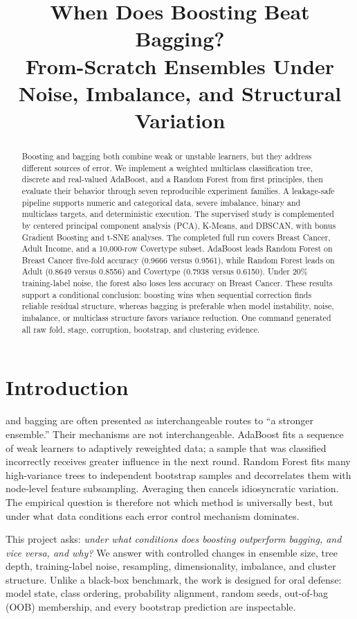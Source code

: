 \documentclass[conference]{IEEEtran}
\title{When Does Boosting Beat Bagging?\\
\large From-Scratch Ensembles Under Noise, Imbalance, and Structural Variation}
\author{
\IEEEauthorblockN{Member A, Member B, Member C, Member D}
\IEEEauthorblockA{AI Academy, National AI Center\\Spring 2026}
}
\begin{document}
\maketitle

\begin{abstract}
Boosting and bagging both combine weak or unstable learners, but they address
different sources of error. We implement a weighted multiclass classification
tree, discrete and real-valued AdaBoost, and a Random Forest from first
principles, then evaluate their behavior through seven reproducible experiment
families. A leakage-safe pipeline supports numeric and categorical data,
severe imbalance, binary and multiclass targets, and deterministic execution.
The supervised study is complemented by centered principal component analysis
(PCA), K-Means, and DBSCAN, with bonus Gradient Boosting and t-SNE analyses.
The completed full run covers Breast Cancer, Adult Income, and a 10,000-row
Covertype subset. AdaBoost leads Random Forest on Breast Cancer five-fold
accuracy (0.9666 versus 0.9561), while Random Forest leads on Adult (0.8649
versus 0.8556) and Covertype (0.7938 versus 0.6150). Under 20\% training-label
noise, the forest also loses less accuracy on Breast Cancer. These results
support a conditional conclusion: boosting wins when sequential correction
finds reliable residual structure, whereas bagging is preferable when model
instability, noise, imbalance, or multiclass structure favors variance
reduction. One command generated all raw fold, stage, corruption, bootstrap,
and clustering evidence.
\end{abstract}

\section{Introduction}
 and bagging are often presented as interchangeable
routes to ``a stronger ensemble.'' Their mechanisms are not interchangeable.
AdaBoost fits a sequence of weak learners to adaptively reweighted data; a
sample that was classified incorrectly receives greater influence in the next
round. Random Forest fits many high-variance trees to independent bootstrap
samples and decorrelates them with node-level feature subsampling. Averaging
then cancels idiosyncratic variation. The empirical question is therefore not
which method is universally best, but under what data conditions each error
control mechanism dominates.

This project asks: \emph{under what conditions does boosting outperform
bagging, and vice versa, and why?} We answer with controlled changes in
ensemble size, tree depth, training-label noise, resampling, dimensionality,
imbalance, and cluster structure. Unlike a black-box benchmark, the work is
designed for oral defense: model state, class ordering, probability alignment,
random seeds, out-of-bag (OOB) membership, and every bootstrap prediction are
inspectable.
\end{document}
